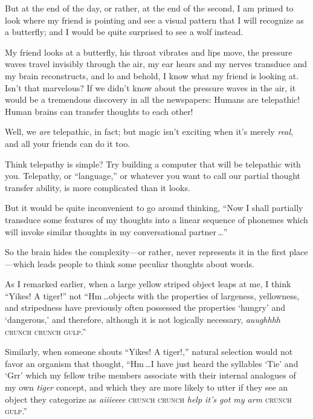 {{{
 But at the end of the day, or rather, at the end of the second, I
am primed to look where my friend is pointing and see a visual pattern
that I will recognize as a butterfly; and I would be quite surprised to
see a wolf instead.}

{
 My friend looks at a butterfly, his throat vibrates and lips move,
the pressure waves travel invisibly through the air, my ear hears and
my nerves transduce and my brain reconstructs, and lo and behold, I
know what my friend is looking at. Isn't that
marvelous? If we didn't know about the pressure waves
in the air, it would be a tremendous discovery in all the newspapers:
Humans are telepathic! Human brains can transfer thoughts to each
other!}

{
 Well, we \textit{are} telepathic, in fact; but magic
isn't exciting when it's merely
\textit{real}, and all your friends can do it too.}

{
 Think telepathy is simple? Try building a computer that will be
telepathic with you. Telepathy, or
``language,'' or whatever you want
to call our partial thought transfer ability, is more complicated than
it looks.}

{
 But it would be quite inconvenient to go around thinking,
``Now I shall partially transduce some features of my
thoughts into a linear sequence of phonemes which will invoke similar
thoughts in my conversational partner\,\ldots''}

{
 So the brain hides the complexity---or rather, never represents it
in the first place---which leads people to think some peculiar thoughts
about words.}

{
 As I remarked earlier, when a large yellow striped object leaps at
me, I think ``Yikes! A tiger!'' not
``Hm\,\ldots objects with the properties of largeness,
yellowness, and stripedness have previously often possessed the
properties `hungry' and
`dangerous,' and therefore, although it
is not logically necessary, \textit{auughhhh} \textsc{crunch crunch
gulp}.''}

{
 Similarly, when someone shouts ``Yikes! A
tiger!,'' natural selection would not favor an
organism that thought, ``Hm\,\ldots I have just heard
the syllables `Tie' and
`Grr' which my fellow tribe members
associate with their internal analogues of my own \textit{tiger}
concept, and which they are more likely to utter if they see an object
they categorize as \textit{aiiieeee} \textsc{crunch crunch} \textit{help
it's got my arm} \textsc{crunch gulp}.''}


}}
